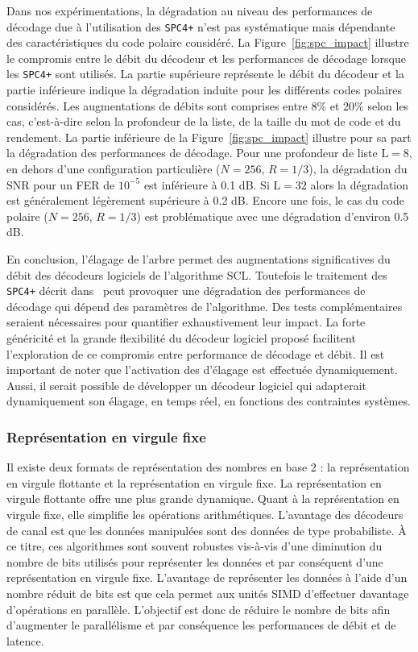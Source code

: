Dans nos expérimentations, la dégradation au niveau des performances de décodage due à l'utilisation des \noeuds \texttt{SPC4+} n'est pas systématique mais dépendante des caractéristiques du code polaire considéré. La Figure~\ref{fig:spc_impact} illustre le compromis entre le débit du décodeur et les performances de décodage lorsque les \noeuds \texttt{SPC4+} sont utilisés. La partie supérieure représente le débit du décodeur et la partie inférieure indique la dégradation induite pour les différents codes polaires considérés. Les augmentations de débits sont comprises entre 8\% et 20\% selon les cas, c'est-à-dire selon la profondeur de la liste, de la taille du mot de code et du rendement. La partie inférieure de la Figure~\ref{fig:spc_impact} illustre pour sa part la dégradation des performances de décodage. Pour une profondeur de liste $\mathrm{L}=8$, en dehors d'une configuration particulière ($N=256$, $R=1/3$), la dégradation du SNR pour un FER de $10^{-5}$ est inférieure à 0.1 dB. Si $\mathrm{L}=32$ alors la dégradation est généralement légèrement supérieure à 0.2 dB. Encore une fois, le cas du code polaire ($N=256$, $R=1/3$) est problématique avec une dégradation d'environ 0.5 dB.

En conclusion, l'élagage de l'arbre permet des augmentations significatives du débit des décodeurs logiciels de l'algorithme SCL. Toutefois le traitement des \noeuds \texttt{SPC4+} décrit dans~\cite{sarkis_fast_2016} peut provoquer une dégradation des performances de décodage qui dépend des paramètres de l'algorithme. Des tests complémentaires seraient nécessaires pour quantifier exhaustivement leur impact. La forte généricité et la grande flexibilité du décodeur logiciel proposé facilitent l'exploration de ce compromis entre performance de décodage et débit. Il est important de noter que l'activation des \noeuds d'élagage est effectuée dynamiquement. Aussi, il serait possible de développer un décodeur logiciel qui adapterait dynamiquement son élagage, en temps réel, en fonctions des contraintes systèmes.

\subsubsection{Représentation en virgule fixe}

Il existe deux formats de représentation des nombres en base 2 : la représentation en virgule flottante et la représentation en virgule fixe. La représentation en virgule flottante offre une plus grande dynamique. Quant à la représentation en virgule fixe, elle simplifie les opérations arithmétiques. L'avantage des décodeurs de canal est que les données manipulées sont des données de type probabiliste. \`A ce titre, ces algorithmes sont souvent robustes vis-à-vis d'une diminution du nombre de bits utilisés pour représenter les données et par conséquent d'une représentation en virgule fixe.
L'avantage de représenter les données à l'aide d'un nombre réduit de bits est que cela permet aux unités SIMD d'effectuer davantage d'opérations en parallèle. 
L'objectif est donc de réduire le nombre de bits afin d'augmenter le parallélisme et par conséquence les performances de débit et de latence.

